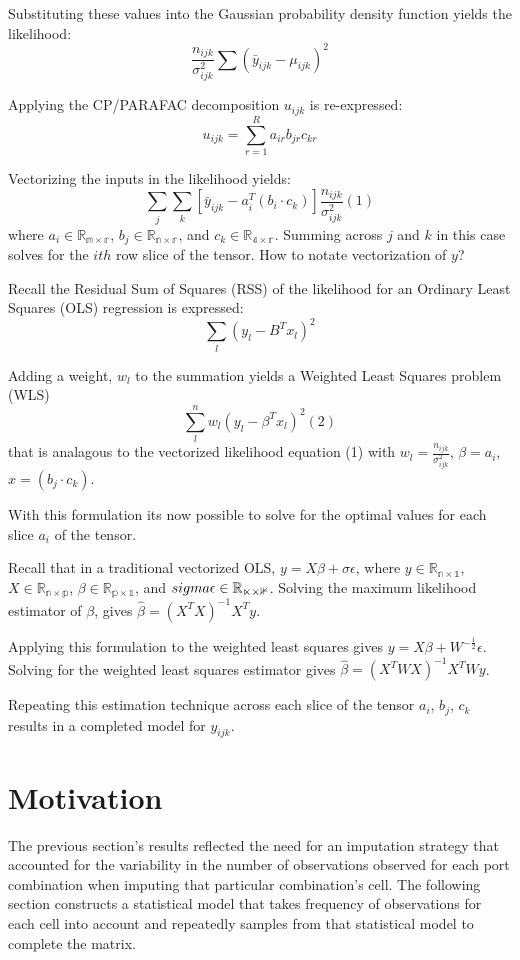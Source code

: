 \documentclass[12pt,twoside]{dukestatscithesis}
\theoremstyle{definition}
\theoremstyle{definition}
\theoremstyle{definition}
\theoremstyle{remark}
\begin{document}
Substituting these values into the Gaussian probability density function
yields the likelihood:
\[\frac{n_{ijk}}{\sigma^2_{ijk}}\sum(\bar y_{ijk} - \mu_{ijk})^2\]

Applying the CP/PARAFAC decomposition \(u_{ijk}\) is re-expressed:
\[u_{ijk} = \sum_{r=1}^Ra_{ir}b_{jr}c_{kr}\]

Vectorizing the inputs in the likelihood yields:
\[\sum_j\sum_k[\bar y_{ijk} - a_i^T(b_i \cdotp c_k)]\frac{n_{ijk}}{\sigma^2_{ijk}} (1)\]
where \(a_i \in \mathbb{R_{m \times r}}\),
\(b_j \in \mathbb{R_{n \times r}}\), and
\(c_k \in \mathbb{R_{4 \times r}}\). Summing across \(j\) and \(k\) in
this case solves for the \(ith\) row slice of the tensor. How to notate
vectorization of \(y\)?

Recall the Residual Sum of Squares (RSS) of the likelihood for an
Ordinary Least Squares (OLS) regression is expressed:
\[\sum_l(y_l-B^Tx_l)^2\]

Adding a weight, \(w_l\) to the summation yields a Weighted Least
Squares problem (WLS) \[\sum_l^nw_l(y_l-\beta^Tx_l)^2 (2)\] that is
analagous to the vectorized likelihood equation (1) with
\(w_l = \frac{n_{ijk}}{\sigma^2_{ijk}}\), \(\beta = a_i\),
\(x = (b_j \cdotp c_k)\).

With this formulation its now possible to solve for the optimal values
for each slice \(a_i\) of the tensor.

Recall that in a traditional vectorized OLS,
\(y = X\beta + \sigma\epsilon\), where
\(y \in \mathbb{R_{n \times 1}}\), \(X \in \mathbb{R_{n \times p}}\),
\(\beta \in \mathbb{R_{p \times 1}}\), and
\(\\sigma\epsilon \in \mathbb{R_{n \times 1}}\). Solving the maximum
likelihood estimator of \(\beta\), gives
\(\hat \beta = (X^TX)^{-1}X^Ty\).

Applying this formulation to the weighted least squares gives
\(y = X\beta + W^{-\frac{1}{2}}\epsilon\). Solving for the weighted
least squares estimator gives \(\hat \beta = (X^TWX)^{-1}X^TWy\).

Repeating this estimation technique across each slice of the tensor
\(a_i\), \(b_j\), \(c_k\) results in a completed model for \(y_{ijk}\).

\section{Motivation}\label{motivation-3}

The previous section's results reflected the need for an imputation
strategy that accounted for the variability in the number of
observations observed for each port combination when imputing that
particular combination's cell. The following section constructs a
statistical model that takes frequency of observations for each cell
into account and repeatedly samples from that statistical model to
complete the matrix.
\end{document}
